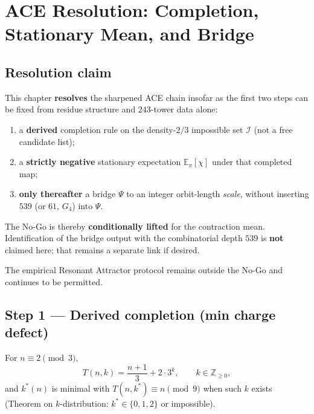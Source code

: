 
\chapter{ACE Resolution: Completion, Stationary Mean, and Bridge}
\label{ch:ACE-resolve}

\section{Resolution claim}

This chapter \textbf{resolves} the sharpened ACE chain insofar as the first two
steps can be fixed from residue structure and \(243\)-tower data alone:
\begin{enumerate}[label=(\arabic*)]
  \item a \textbf{derived} completion rule on the density-\(2/3\) impossible
        set \(\mathcal{I}\) (not a free candidate list);
  \item a \textbf{strictly negative} stationary expectation
        \(\mathbb{E}_\pi[\chi]\) under that completed map;
  \item \textbf{only thereafter} a bridge \(\Psi\) to an integer orbit-length
        \emph{scale}, without inserting \(539\) (or \(61\), \(G_4\)) into
        \(\Psi\).
\end{enumerate}
The No-Go is thereby \textbf{conditionally lifted} for the contraction mean.
Identification of the bridge output with the combinatorial depth \(539\) is
\textbf{not} claimed here; that remains a separate link if desired.

The empirical Resonant Attractor protocol remains outside the No-Go and
continues to be permitted.

\section{Step 1 --- Derived completion (min charge defect)}
\label{sec:completion-derived}

\begin{definition}
\label{def:partial}
For \(n\equiv 2\pmod{3}\),
\[
T(n,k)=\frac{n+1}{3}+2\cdot 3^{k},\qquad k\in\mathbb{Z}_{\ge 0},
\]
and \(k^\ast(n)\) is minimal with \(T(n,k^\ast)\equiv n\pmod{9}\) when such \(k\)
exists (Theorem on \(k\)-distribution: \(k^\ast\in\{0,1,2\}\) or impossible).
\end{definition}

